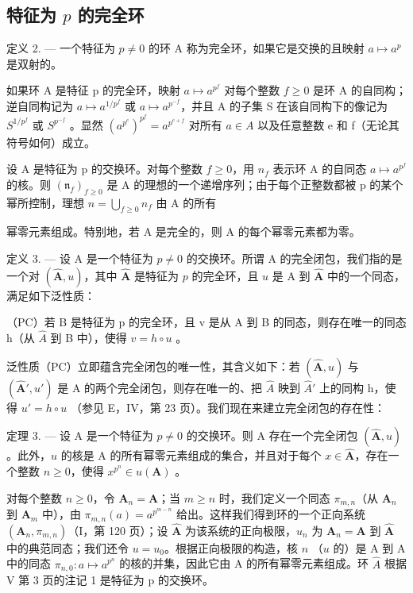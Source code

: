 \subsection{\texorpdfstring{特征为 \(p\) 的完全环}{特征为 p 的完全环}}

定义 2. --- 一个特征为 \(p \neq 0\) 的环 A 称为完全环，如果它是交换的且映射 \(a \mapsto a^p\) 是双射的。

如果环 A 是特征 p 的完全环，映射 \(a \mapsto a^{p^{f}}\) 对每个整数 \(f \geqslant 0\) 是环 A 的自同构；逆自同构记为 \(a \mapsto a^{1/p^{f}}\) 或 \(a \mapsto a^{p^{-f}}\)，并且 A 的子集 S 在该自同构下的像记为 \(S^{1/p^{f}}\) 或 \(S^{p^{-f}}\) 。显然 \((a^{p^{e}})^{p^{f}} = a^{p^{e+f}}\) 对所有 \(a \in A\) 以及任意整数 e 和 f（无论其符号如何）成立。

设 A 是特征为 p 的交换环。对每个整数 \(f \geqslant 0\)，用 \(n_{f}\) 表示环 A 的自同态 \(a \mapsto a^{p^{f}}\) 的核。则 \((\mathfrak{n}_{f})_{f \geqslant 0}\) 是 A 的理想的一个递增序列；由于每个正整数都被 p 的某个幂所控制，理想 \(n = \bigcup_{f \geqslant 0} n_{f}\) 由 A 的所有

幂零元素组成。特别地，若 A 是完全的，则 A 的每个幂零元素都为零。

定义 3. --- 设 A 是一个特征为 \(p \neq 0\) 的交换环。所谓 A 的完全闭包，我们指的是一个对 \((\hat{\mathbf{A}}, u)\)，其中 \(\hat{\mathbf{A}}\) 是特征为 \(p\) 的完全环，且 \(u\) 是 A 到 \(\hat{\mathbf{A}}\) 中的一个同态，满足如下泛性质：

（PC）若 B 是特征为 p 的完全环，且 v 是从 A 到 B 的同态，则存在唯一的同态 h（从 \(\hat{A}\) 到 B 中），使得 \(v = h \circ u\) 。

泛性质（PC）立即蕴含完全闭包的唯一性，其含义如下：若 \((\hat{\mathbf{A}}, u)\) 与 \((\hat{\mathbf{A}}', u')\) 是 A 的两个完全闭包，则存在唯一的、把 \(\hat{A}\) 映到 \(\hat{A}'\) 上的同构 h，使得 \(u' = h \circ u\) （参见 E，IV，第 23 页）。我们现在来建立完全闭包的存在性：

定理 3. --- 设 A 是一个特征为 \(p \neq 0\) 的交换环。则 A 存在一个完全闭包 \((\hat{\mathbf{A}}, u)\)。此外，\(u\) 的核是 A 的所有幂零元素组成的集合，并且对于每个 \(x \in \hat{\mathbf{A}}\)，存在一个整数 \(n \geqslant 0\)，使得 \(x^{p^n} \in u(\mathbf{A})\) 。

对每个整数 \(n \geqslant 0\)，令 \(\mathbf{A}_n = \mathbf{A}\)；当 \(m \geqslant n\) 时，我们定义一个同态 \(\pi_{m,n}\)（从 \(\mathbf{A}_n\) 到 \(\mathbf{A}_m\) 中），由 \(\pi_{m,n}(a) = a^{p^{m-n}}\) 给出。这样我们得到环的一个正向系统 \((\mathbf{A}_n, \pi_{m,n})\)（I，第 120 页）；设 \(\hat{\mathbf{A}}\) 为该系统的正向极限，\(u_n\) 为 \(\mathbf{A}_n = \mathbf{A}\) 到 \(\hat{\mathbf{A}}\) 中的典范同态；我们还令 \(u = u_0\)。根据正向极限的构造，核 \(n\) （\(u\) 的）是 A 到 A 中的同态 \(\pi_{n,0}: a \mapsto a^{p^n}\) 的核的并集，因此它由 A 的所有幂零元素组成。环 \(\hat{A}\) 根据 V 第 3 页的注记 1 是特征为 p 的交换环。

